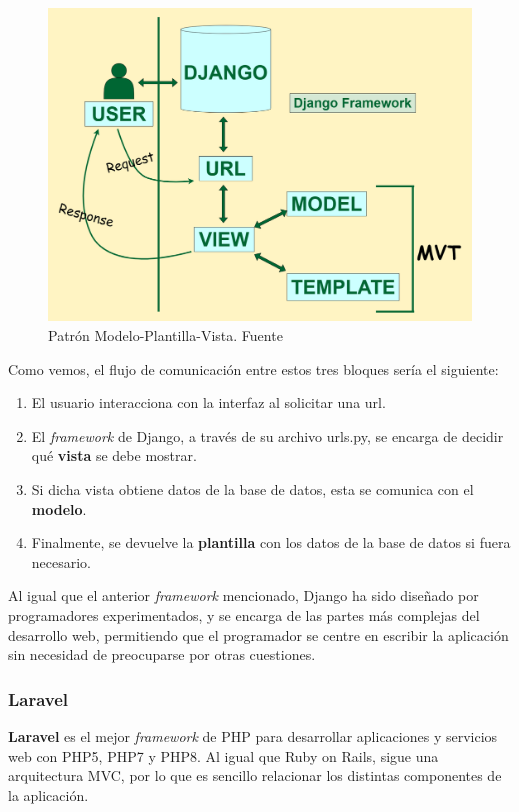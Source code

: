         \begin{figure}[H]
            \centering
            \includegraphics[scale=0.22]{imagenes/mvt.png}
            \caption[Patrón Modelo-Plantilla-Vista]{Patrón Modelo-Plantilla-Vista. Fuente \cite{mvt}}
            \label{fig:mvt}
        \end{figure}

    Como vemos, el flujo de comunicación entre estos tres bloques sería el siguiente:
        
       \begin{enumerate}
           \item El usuario interacciona con la interfaz al solicitar una url.
           \item El \textit{framework} de Django, a través de su archivo urls.py, se encarga
           de decidir qué \textbf{vista} se debe mostrar.
           \item Si dicha vista obtiene datos de la base de datos, esta se comunica con el 
           \textbf{modelo}.
           \item Finalmente, se devuelve la \textbf{plantilla} con los datos de la base de
           datos si fuera necesario.
       \end{enumerate}

    Al igual que el anterior \textit{framework} mencionado, Django ha sido diseñado por
    programadores experimentados, y se encarga de las partes más complejas del desarrollo
    web, permitiendo que el programador se centre en escribir la aplicación sin necesidad
    de preocuparse por otras cuestiones.

    \subsubsection{Laravel}
    \textbf{Laravel} \cite{laravel} es el mejor \textit{framework} de PHP para desarrollar
    aplicaciones y servicios web con PHP5, PHP7 y PHP8. Al igual que Ruby on Rails, sigue
    una arquitectura MVC, por lo que es sencillo relacionar los distintas componentes de la
    aplicación.\\

